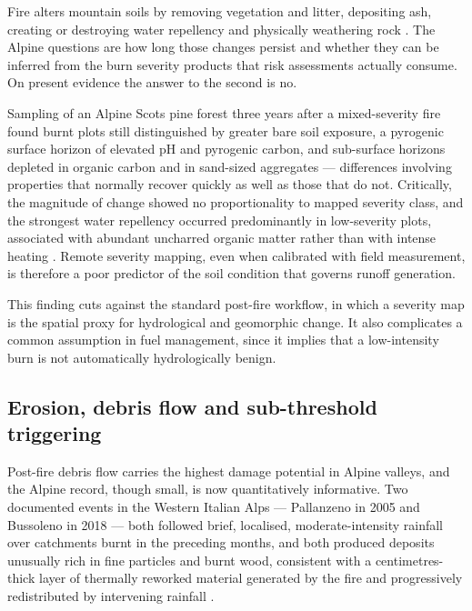 \documentclass[11pt,a4paper]{article}
\begin{document}
Fire alters mountain soils by removing vegetation and litter, depositing ash, creating or destroying water repellency and physically weathering rock \citep{santi_wildfire_2022}. The Alpine questions are how long those changes persist and whether they can be inferred from the burn severity products that risk assessments actually consume. On present evidence the answer to the second is no.

Sampling of an Alpine Scots pine forest three years after a mixed-severity fire found burnt plots still distinguished by greater bare soil exposure, a pyrogenic surface horizon of elevated pH and pyrogenic carbon, and sub-surface horizons depleted in organic carbon and in sand-sized aggregates --- differences involving properties that normally recover quickly as well as those that do not. Critically, the magnitude of change showed no proportionality to mapped severity class, and the strongest water repellency occurred predominantly in low-severity plots, associated with abundant uncharred organic matter rather than with intense heating \citep{negri_wildfire_2026}. Remote severity mapping, even when calibrated with field measurement, is therefore a poor predictor of the soil condition that governs runoff generation.

This finding cuts against the standard post-fire workflow, in which a severity map is the spatial proxy for hydrological and geomorphic change. It also complicates a common assumption in fuel management, since it implies that a low-intensity burn is not automatically hydrologically benign.

\subsection{Erosion, debris flow and sub-threshold triggering}

Post-fire debris flow carries the highest damage potential in Alpine valleys, and the Alpine record, though small, is now quantitatively informative. Two documented events in the Western Italian Alps --- Pallanzeno in 2005 and Bussoleno in 2018 --- both followed brief, localised, moderate-intensity rainfall over catchments burnt in the preceding months, and both produced deposits unusually rich in fine particles and burnt wood, consistent with a centimetres-thick layer of thermally reworked material generated by the fire and progressively redistributed by intervening rainfall \citep{tiranti_wildfires_2021}.
\end{document}
